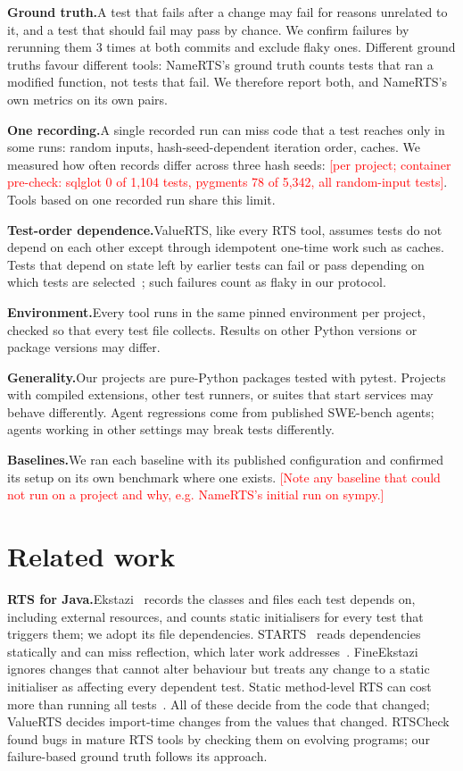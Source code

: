 \documentclass[acmsmall,screen,review,anonymous]{acmart}
\newcommand{\ph}[1]{\textcolor{red}{[#1]}}
\newcommand{\tool}{ValueRTS\xspace}
\newcommand{\para}[1]{\smallskip\noindent\textbf{#1}\hspace{0.4em}}
\begin{document}
\para{Ground truth.}A test that fails after a change may fail for reasons unrelated to it, and a test that should fail may pass by chance. We confirm failures by rerunning them 3 times at both commits and exclude flaky ones. Different ground truths favour different tools: NameRTS's ground truth counts tests that ran a modified function, not tests that fail. We therefore report both, and NameRTS's own metrics on its own pairs.

\para{One recording.}A single recorded run can miss code that a test reaches only in some runs: random inputs, hash-seed-dependent iteration order, caches. We measured how often records differ across three hash seeds: \ph{per project; container pre-check: sqlglot 0 of 1,104 tests, pygments 78 of 5,342, all random-input tests}. Tools based on one recorded run share this limit.

\para{Test-order dependence.}\tool, like every RTS tool, assumes tests do not depend on each other except through idempotent one-time work such as caches. Tests that depend on state left by earlier tests can fail or pass depending on which tests are selected~\cite{lam2020dependent}; such failures count as flaky in our protocol.

\para{Environment.}Every tool runs in the same pinned environment per project, checked so that every test file collects. Results on other Python versions or package versions may differ.

\para{Generality.}Our projects are pure-Python packages tested with pytest. Projects with compiled extensions, other test runners, or suites that start services may behave differently. Agent regressions come from published SWE-bench agents; agents working in other settings may break tests differently.

\para{Baselines.}We ran each baseline with its published configuration and confirmed its setup on its own benchmark where one exists. \ph{Note any baseline that could not run on a project and why, e.g. NameRTS's initial run on sympy.}


\section{Related work}\label{sec:related-work}
\para{RTS for Java.}Ekstazi~\cite{gligoric2015ekstazi} records the classes and files each test depends on, including external resources, and counts static initialisers for every test that triggers them; we adopt its file dependencies. STARTS~\cite{legunsen2017starts} reads dependencies statically and can miss reflection, which later work addresses~\cite{shi2019reflection}. FineEkstazi~\cite{liu2023fineekstazi} ignores changes that cannot alter behaviour but treats any change to a static initialiser as affecting every dependent test. Static method-level RTS can cost more than running all tests~\cite{legunsen2016static}. All of these decide from the code that changed; \tool decides import-time changes from the values that changed. RTSCheck~\cite{zhu2019rtscheck} found bugs in mature RTS tools by checking them on evolving programs; our failure-based ground truth follows its approach.
\end{document}
